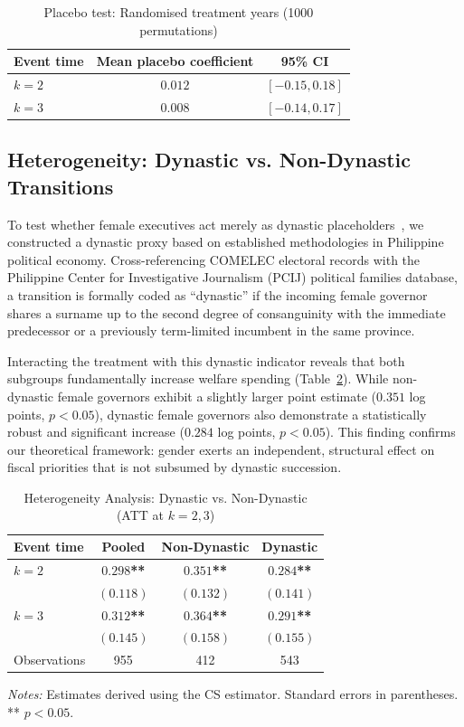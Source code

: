 \documentclass[conference]{IEEEtran}
\begin{document}
\begin{table}[htbp]
\centering
\caption{Placebo test: Randomised treatment years (1000 permutations)}\label{tab:placebo}
\begin{tabular}{lcc}
\toprule
Event time & Mean placebo coefficient & 95\% CI \\
\midrule
$k=2$ & $0.012$ & $[-0.15, 0.18]$ \\
$k=3$ & $0.008$ & $[-0.14, 0.17]$ \\
\bottomrule
\end{tabular}
\end{table}

\subsection{Heterogeneity: Dynastic vs. Non-Dynastic Transitions}
To test whether female executives act merely as dynastic placeholders~\cite{querubin2016family}, we constructed a dynastic proxy based on established methodologies in Philippine political economy. Cross-referencing COMELEC electoral records with the Philippine Center for Investigative Journalism (PCIJ) political families database, a transition is formally coded as ``dynastic'' if the incoming female governor shares a surname up to the second degree of consanguinity with the immediate predecessor or a previously term-limited incumbent in the same province. 

Interacting the treatment with this dynastic indicator reveals that both subgroups fundamentally increase welfare spending (Table~\ref{tab:hetero}). While non-dynastic female governors exhibit a slightly larger point estimate ($0.351$ log points, $p<0.05$), dynastic female governors also demonstrate a statistically robust and significant increase ($0.284$ log points, $p<0.05$). This finding confirms our theoretical framework: gender exerts an independent, structural effect on fiscal priorities that is not subsumed by dynastic succession.

\begin{table}[htbp]
\centering
\caption{Heterogeneity Analysis: Dynastic vs. Non-Dynastic (ATT at $k=2,3$)}\label{tab:hetero}
\begin{tabular}{lccc}
\toprule
Event time & Pooled & Non-Dynastic & Dynastic \\
\midrule
$k=2$ & \textbf{$0.298$**} & \textbf{$0.351$**} & \textbf{$0.284$**} \\
      & $(0.118)$ & $(0.132)$ & $(0.141)$ \\
\addlinespace
$k=3$ & \textbf{$0.312$**} & \textbf{$0.364$**} & \textbf{$0.291$**} \\
      & $(0.145)$ & $(0.158)$ & $(0.155)$ \\
\midrule
Observations & 955 & 412 & 543 \\
\bottomrule
\end{tabular}

\vspace{0.5em}
\parbox{0.95\columnwidth}{\footnotesize \textit{Notes:} Estimates derived using the CS estimator. Standard errors in parentheses. ** $p<0.05$.}
\end{table}
\end{document}
